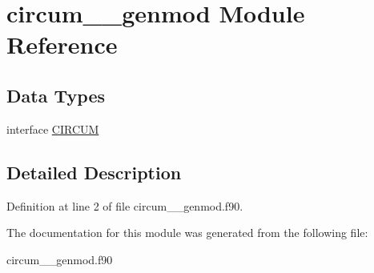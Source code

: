\hypertarget{classcircum____genmod}{\section{circum\+\_\+\+\_\+genmod Module Reference}
\label{classcircum____genmod}
}
\subsection*{Data Types}
\begin{DoxyCompactItemize}
\item 
interface \hyperlink{interfacecircum____genmod_1_1_c_i_r_c_u_m}{C\+I\+R\+C\+U\+M}
\end{DoxyCompactItemize}


\subsection{Detailed Description}


Definition at line 2 of file circum\+\_\+\+\_\+genmod.\+f90.



The documentation for this module was generated from the following file\+:\begin{DoxyCompactItemize}
\item 
circum\+\_\+\+\_\+genmod.\+f90\end{DoxyCompactItemize}
